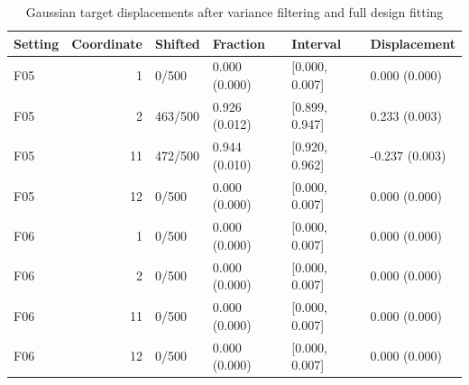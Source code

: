 \begin{table}

\caption{\label{tab:registered-prescreen-targets}Gaussian target displacements after variance filtering and full design fitting}
\centering
\begin{tabular}[t]{lrllll}
\toprule
Setting & Coordinate & Shifted & Fraction & Interval & Displacement\\
\midrule
F05 & 1 & 0/500 & 0.000 (0.000) & {}[0.000, 0.007] & 0.000 (0.000)\\
F05 & 2 & 463/500 & 0.926 (0.012) & {}[0.899, 0.947] & 0.233 (0.003)\\
F05 & 11 & 472/500 & 0.944 (0.010) & {}[0.920, 0.962] & -0.237 (0.003)\\
F05 & 12 & 0/500 & 0.000 (0.000) & {}[0.000, 0.007] & 0.000 (0.000)\\
F06 & 1 & 0/500 & 0.000 (0.000) & {}[0.000, 0.007] & 0.000 (0.000)\\
F06 & 2 & 0/500 & 0.000 (0.000) & {}[0.000, 0.007] & 0.000 (0.000)\\
F06 & 11 & 0/500 & 0.000 (0.000) & {}[0.000, 0.007] & 0.000 (0.000)\\
F06 & 12 & 0/500 & 0.000 (0.000) & {}[0.000, 0.007] & 0.000 (0.000)\\
\bottomrule
\end{tabular}
\end{table}
